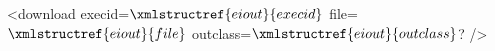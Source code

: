 <download execid=$\xmlstructref{eiout}{execid}$ file=$\xmlstructref{eiout}{file}$ outclass=$\xmlstructref{eiout}{outclass}$? />


